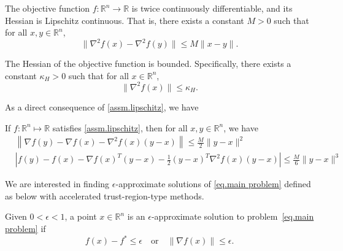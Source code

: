 \documentclass{article}
\begin{document}
\begin{assumption}
    \label{assm.lipschitz}
    The objective function $f: \mathbb{R}^n \to \mathbb{R}$ is twice continuously differentiable, and its Hessian is Lipschitz continuous. That is, there exists a constant $M > 0$ such that for all $x, y \in \mathbb{R}^n$,
    \begin{equation}
        \label{eq.main assm}
        \|\nabla^2 f(x) - \nabla^2 f(y)\| \leq M \|x - y\|. \end{equation}
\end{assumption}

\begin{assumption}
    \label{assm.bounded hessian}
    The Hessian of the objective function is bounded. Specifically, there exists a constant $\kappa_H > 0$ such that for all $x \in \mathbb{R}^n$, \begin{equation}
        \label{eq.bounded hessian}
        \|\nabla^2 f(x)\| \leq \kappa_H.
    \end{equation} \end{assumption}

As a direct consequence of \autoref{assm.lipschitz}, we have
\begin{lemma}\label{lem.lipschitz}
    If \(f:\mathbb{R}^n \mapsto \mathbb{R}\) satisfies \autoref{assm.lipschitz}, then for all \(x,y\in \mathbb{R}^n\), we have
    \begin{subequations}
        \begin{align}
            \label{eq.first-order exp}
             & \left\|\nabla f(y)-\nabla f(x)-\nabla^{2} f(x)(y-x)\right\|                       \leq \frac{M}{2}\|y-x\|^{2} \\
            \label{eq.second-order exp}
             & \left|f(y)-f(x)-\nabla f(x)^T(y-x)-\frac{1}{2}(y-x)^T\nabla^{2} f(x)(y-x)\right|  \leq \frac{M}{6}\|y-x\|^{3}
        \end{align}
    \end{subequations}
\end{lemma}

We are interested in finding $\epsilon$-approximate solutions of \eqref{eq.main problem} defined as below with accelerated trust-region-type methods.

\begin{definition}
    \label{def.approximate solution}
    Given $0<\epsilon <1$, a point $x \in \mathbb{R}^n$ is an $\epsilon$-approximate solution to problem~\eqref{eq.main problem} if
    \begin{equation}
        \label{eq.approximate solution}
        f(x) - f^* \leq \epsilon \quad \text{or} \quad \|\nabla f(x)\| \leq \epsilon.
    \end{equation}
\end{definition}
\end{document}

